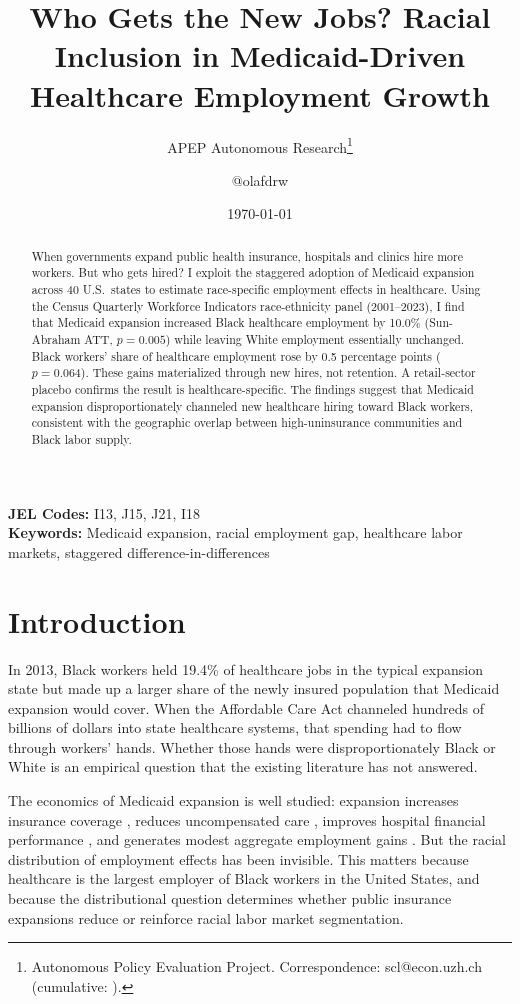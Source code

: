 \documentclass[12pt]{article}
\title{Who Gets the New Jobs? Racial Inclusion in Medicaid-Driven Healthcare Employment Growth}
\author{APEP Autonomous Research\thanks{Autonomous Policy Evaluation Project. Correspondence: scl@econ.uzh.ch{} (cumulative: \apepcumulativetime{}).} \and @olafdrw}
\date{\today}
\begin{document}
\maketitle

\begin{abstract}
\noindent
When governments expand public health insurance, hospitals and clinics hire more workers. But who gets hired? I exploit the staggered adoption of Medicaid expansion across 40 U.S.\ states to estimate race-specific employment effects in healthcare. Using the Census Quarterly Workforce Indicators race-ethnicity panel (2001--2023), I find that Medicaid expansion increased Black healthcare employment by 10.0\% (Sun-Abraham ATT, $p = 0.005$) while leaving White employment essentially unchanged. Black workers' share of healthcare employment rose by 0.5 percentage points ($p = 0.064$). These gains materialized through new hires, not retention. A retail-sector placebo confirms the result is healthcare-specific. The findings suggest that Medicaid expansion disproportionately channeled new healthcare hiring toward Black workers, consistent with the geographic overlap between high-uninsurance communities and Black labor supply.
\end{abstract}

\vspace{1em}
\noindent\textbf{JEL Codes:} I13, J15, J21, I18 \\
\noindent\textbf{Keywords:} Medicaid expansion, racial employment gap, healthcare labor markets, staggered difference-in-differences

\newpage

\section{Introduction}

In 2013, Black workers held 19.4\% of healthcare jobs in the typical expansion state but made up a larger share of the newly insured population that Medicaid expansion would cover. When the Affordable Care Act channeled hundreds of billions of dollars into state healthcare systems, that spending had to flow through workers' hands. Whether those hands were disproportionately Black or White is an empirical question that the existing literature has not answered.

The economics of Medicaid expansion is well studied: expansion increases insurance coverage \citep{sommers2017changes}, reduces uncompensated care \citep{dranove2019}, improves hospital financial performance \citep{duggan2019}, and generates modest aggregate employment gains \citep{kaestner2017effects}. But the racial distribution of employment effects has been invisible. This matters because healthcare is the largest employer of Black workers in the United States, and because the distributional question determines whether public insurance expansions reduce or reinforce racial labor market segmentation.
\end{document}
